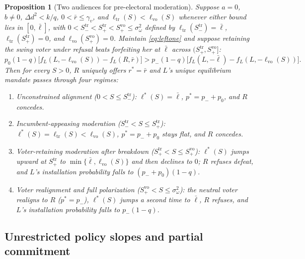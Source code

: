 \documentclass[11pt,letterpaper]{article}
\newtheorem{proposition}{Proposition}
\newcommand{\Dd}{\Delta d}
\begin{document}
\begin{proposition}[Two audiences for pre-electoral moderation]\label{prop:realign}
Suppose $a=0$, $b\ne 0$, $\Dd^2<k/q$, $0<\bar r\le\gamma_v$, and $\ell_{\mathrm{tr}}(S)<\ell_{\mathrm{vo}}(S)$ whenever either bound lies in $[0,\bar\ell]$, with $0<S_-^{\mathrm{tr}}<S_+^{\mathrm{tr}}<S_+^{\mathrm{vo}}\le\sigma_\omega^2$ defined by $\ell_{\mathrm{tr}}(S_-^{\mathrm{tr}})=\bar\ell$, $\ell_{\mathrm{tr}}(S_+^{\mathrm{tr}})=0$, and $\ell_{\mathrm{vo}}(S_+^{\mathrm{vo}})=0$. Maintain \eqref{eq:leftone} and suppose retaining the swing voter under refusal beats forfeiting her at $\bar\ell$ across $(S_+^{\mathrm{tr}},S_+^{\mathrm{vo}}]$:
\begin{equation}
 p_0(1-q)\big[f_L(L,-\ell_{\mathrm{vo}}(S))-f_L(R,\bar r)\big]
 > p_-(1-q)\big[f_L(L,-\bar\ell)-f_L(L,-\ell_{\mathrm{vo}}(S))\big].
 \label{eq:voterretain}
\end{equation}
Then for every $S>0$, $R$ uniquely offers $r^*=\bar r$ and $L$'s unique equilibrium mandate passes through four regimes:
\begin{enumerate}
\item \emph{Unconstrained alignment} ($0<S\le S_-^{\mathrm{tr}}$): $\ell^*(S)=\bar\ell$, $p^*=p_-+p_0$, and $R$ concedes.
\item \emph{Incumbent-appeasing moderation} ($S_-^{\mathrm{tr}}<S\le S_+^{\mathrm{tr}}$): $\ell^*(S)=\ell_{\mathrm{tr}}(S)<\ell_{\mathrm{vo}}(S)$, $p^*=p_-+p_0$ stays flat, and $R$ concedes.
\item \emph{Voter-retaining moderation after breakdown} ($S_+^{\mathrm{tr}}<S\le S_+^{\mathrm{vo}}$): $\ell^*(S)$ jumps upward at $S_+^{\mathrm{tr}}$ to $\min\{\bar\ell,\ell_{\mathrm{vo}}(S)\}$ and then declines to $0$; $R$ refuses defeat, and $L$'s installation probability falls to $(p_-+p_0)(1-q)$.
\item \emph{Voter realignment and full polarization} ($S_+^{\mathrm{vo}}<S\le\sigma_\omega^2$): the neutral voter realigns to $R$ ($p^*=p_-$), $\ell^*(S)$ jumps a second time to $\bar\ell$, $R$ refuses, and $L$'s installation probability falls to $p_-(1-q)$.
\end{enumerate}
\end{proposition}

\subsection{Unrestricted policy slopes and partial commitment}\label{sec:unconstrained}
\end{document}
